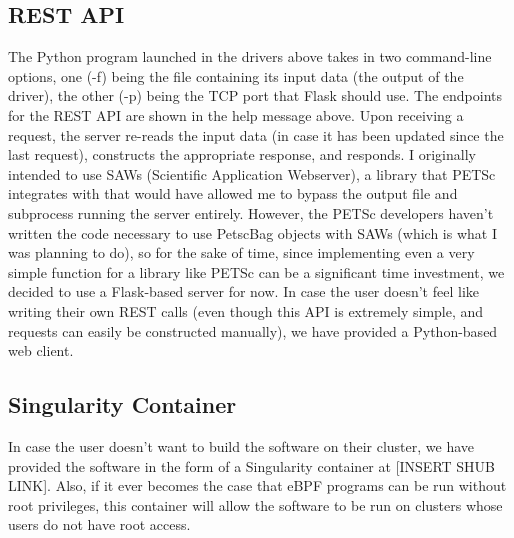 \subsection*{REST API}
The Python program launched in the drivers above takes in two command-line options, one (-f) being the file containing its input data (the output of the driver), the other (-p) being the TCP port that Flask should use.
The endpoints for the REST API are shown in the help message above. Upon receiving a request, the server re-reads the input data (in case it has been updated since the last request), constructs the appropriate response, and responds. I originally intended to use SAWs (Scientific Application Webserver), a library that PETSc integrates with that would have allowed me to bypass the output file and subprocess running the server entirely. However, the PETSc developers haven't written the code necessary to use PetscBag objects with SAWs (which is what I was planning to do), so for the sake of time, since implementing even a very simple function for a library like PETSc can be a significant time investment, we decided to use a Flask-based server for now. In case the user doesn't feel like writing their own REST calls (even though this API is extremely simple, and requests can easily be constructed manually), we have provided a Python-based web client.
\subsection*{Singularity Container}
In case the user doesn't want to build the software on their cluster, we have provided the software in the form of a Singularity container at [INSERT SHUB LINK]. Also, if it ever becomes the case that eBPF programs can be run without root privileges, this container will allow the software to be run on clusters whose users do not have root access. 
